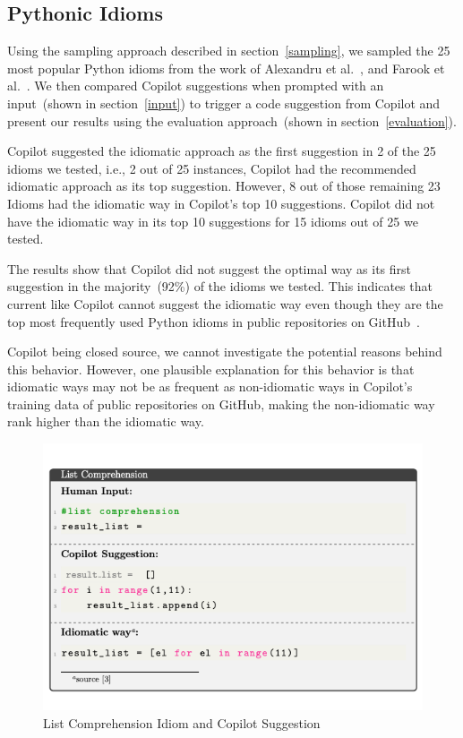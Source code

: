 \subsection{Pythonic Idioms}
\label{idioms}
Using the sampling approach described in section~\ref{sampling}, we sampled the 25 most popular Python idioms from the work of Alexandru et al.~\cite{Alexandru2018}, and Farook et al.~\cite{idioms}. 
We then compared Copilot suggestions when prompted with an input~(shown in section~\ref{input}) to trigger a code suggestion from Copilot and present our results using the evaluation approach~(shown in section~\ref{evaluation}).

Copilot suggested the idiomatic approach as the first suggestion in 2 of the 25 idioms we tested, i.e., 2 out of 25 instances, Copilot had the recommended idiomatic approach as its top suggestion. 
However, 8 out of those remaining 23 Idioms had the idiomatic way in Copilot's top 10 suggestions. Copilot did not have the idiomatic way in its top 10 suggestions for 15 idioms out of 25 we tested.

The results show that Copilot did not suggest the optimal way as its first suggestion in the majority~(92\%) of the idioms we tested. This indicates that current \cct{} like Copilot cannot suggest the idiomatic way even though they are the top most frequently used Python idioms in public repositories on GitHub~\cite{Alexandru2018, idioms}. 

Copilot being closed source, we cannot investigate the potential reasons behind this behavior. However, one plausible explanation for this behavior is that idiomatic ways may not be as frequent as non-idiomatic ways in Copilot's training data of public repositories on GitHub, making the non-idiomatic way rank higher than the idiomatic way.

\begin{figure}[hbt!]
    \centering
    \includegraphics[width=\linewidth]{Figures/idioms_1.png}
    \caption{List Comprehension Idiom and Copilot Suggestion}
    \label{fig:idioms_1}
\end{figure}

